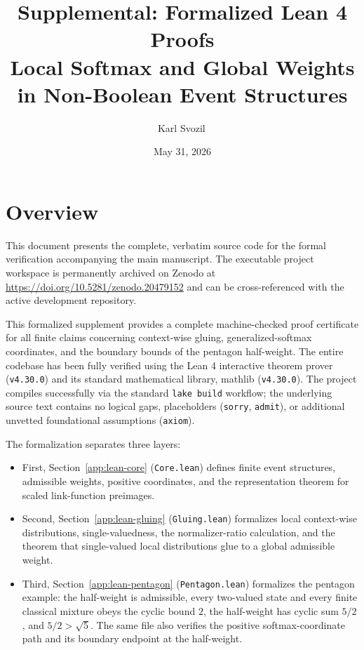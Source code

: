 \documentclass{article}
\title{Supplemental: Formalized Lean 4 Proofs\\Local Softmax and Global Weights in Non-Boolean Event Structures}
\author{Karl Svozil\,\orcidlink{0000-0001-6554-2802}}
\date{May 31, 2026}
\begin{document}
\maketitle

\section*{Overview}
This document presents the complete, verbatim source code for the formal verification accompanying the main manuscript. The executable project workspace is permanently archived on Zenodo at \url{https://doi.org/10.5281/zenodo.20479152} and can be cross-referenced with the active development repository.

This formalized supplement provides a complete machine-checked proof certificate for all finite claims concerning context-wise gluing, generalized-softmax coordinates, and the boundary bounds of the pentagon half-weight. The entire codebase has been fully verified using the Lean 4 interactive theorem prover (\texttt{v4.30.0}) and its standard mathematical library, mathlib (\texttt{v4.30.0}). The project compiles successfully via the standard \texttt{lake build} workflow; the underlying source text contains no logical gaps, placeholders (\texttt{sorry}, \texttt{admit}), or additional unvetted foundational assumptions (\texttt{axiom}).

The formalization separates three layers:
\begin{itemize}
    \item First, Section~\ref{app:lean-core} (\texttt{Core.lean}) defines finite event structures, admissible weights, positive coordinates, and the representation theorem for scaled link-function preimages.
    \item Second, Section~\ref{app:lean-gluing} (\texttt{Gluing.lean}) formalizes local context-wise distributions, single-valuedness, the normalizer-ratio calculation, and the theorem that single-valued local distributions glue to a global admissible weight.
    \item Third, Section~\ref{app:lean-pentagon} (\texttt{Pentagon.lean}) formalizes the pentagon example: the half-weight is admissible, every two-valued state and every finite classical mixture obeys the cyclic bound \(2\), the half-weight has cyclic sum \(5/2\), and \(5/2>\sqrt 5\). The same file also verifies the positive softmax-coordinate path and its boundary endpoint at the half-weight.
\end{itemize}

\newpage
\end{document}
